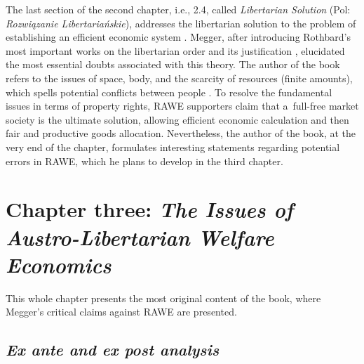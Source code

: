 The last section of the second chapter, i.e., 2.4, called \textit{Libertarian Solution} (Pol: \textit{Rozwiązanie Libertariańskie}), addresses the libertarian solution to the problem of establishing an efficient economic system 
\parencite[][pp.48–49]{megger_sprawiedliwosc_2021}. %
 Megger, after introducing Rothbard's most important works on the libertarian order and its justification 
\parencites[][]{rothbard_ethics_1998}[][]{}, %
 elucidated the most essential doubts associated with this theory. The author of the book refers to the issues of space, body, and the scarcity of resources (finite amounts), which spells potential conflicts between people 
\parencites[][]{gordon_toward_1993}[][]{herbener_pareto_1997}[][pp.311–330]{}[][]{wisniewski_austrian_2019}. %
 To resolve the fundamental issues in terms of property rights, RAWE supporters claim that a~full-free market society is the ultimate solution, allowing efficient economic calculation and then fair and productive goods allocation. Nevertheless, the author of the book, at the very end of the chapter, formulates interesting statements regarding potential errors in RAWE, which he plans to develop in the third chapter.



\section{Chapter three: \textit{The Issues of Austro-Libertarian Welfare Economics}}

This whole chapter 
\parencite[][pp.59–102]{megger_sprawiedliwosc_2021} %
 presents the most original content of the book, where Megger's critical claims against RAWE are presented.



\subsection{\itshape Ex ante and ex post analysis}



